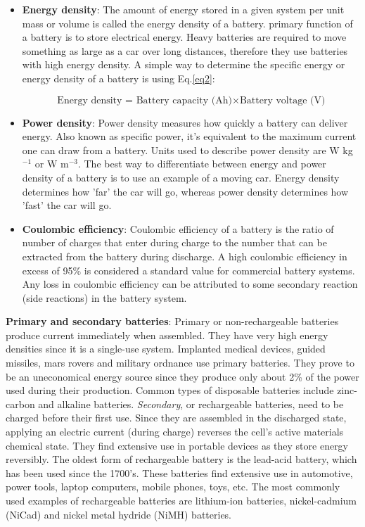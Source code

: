 \begin{itemize}
\item \textbf{Energy density}: The amount of energy stored in a given system per unit mass or volume is called the energy density of a battery. primary function of a battery is to store electrical energy. Heavy batteries are required to move something as large as a car over long distances, therefore they use batteries with high energy density. A simple way to determine the specific energy or energy density of a battery is using Eq.\ref{eq2}:

\begin{equation} \label{eq2}
    \text{Energy density = } \text{Battery capacity (Ah)} \times \text{Battery voltage (V)}
\end{equation}

\item \textbf{Power density}: Power density measures how quickly a battery can deliver energy. Also known as specific power, it's equivalent to the maximum current one can draw from a battery. Units used to describe power density are W kg$^{-1}$ or W m$^{-3}$. The best way to differentiate between energy and power density of a battery is to use an example of a moving car. Energy density determines how 'far' the car will go, whereas power density determines how 'fast' the car will go.

\item \textbf{Coulombic efficiency}: Coulombic efficiency of a battery is the ratio of number of charges that enter during charge to the number that can be extracted from the battery during discharge.  A high coulombic efficiency in excess of 95\% is considered a standard value for commercial battery systems. Any loss in coulombic efficiency can be attributed to some secondary reaction (side reactions) in the battery system. 
\end{itemize}

\textbf{Primary and secondary batteries}: Primary or non-rechargeable batteries produce current immediately when assembled. They have very high energy densities since it is a single-use system. Implanted medical devices, guided missiles, mars rovers and military ordnance use primary batteries. They prove to be an uneconomical energy source since they produce only about 2\% of the power used during their production. Common types of disposable batteries include zinc-carbon and alkaline batteries. 
\textit{Secondary}, or rechargeable batteries, need to be charged before their first use. Since they are  assembled in the discharged state, applying an electric current (during charge) reverses the cell's active materials chemical state. They find extensive use in portable devices as they store energy reversibly. The oldest form of rechargeable battery is the lead-acid battery, which has been used since the 1700's. These batteries find extensive use in automotive, power tools, laptop computers, mobile phones, toys, etc. The most commonly used examples of rechargeable batteries are lithium-ion batteries, nickel-cadmium (NiCad) and nickel metal hydride (NiMH) batteries. 

